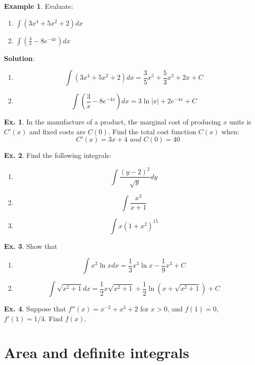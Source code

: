 \documentclass[10pt,a4paper]{book}
\theoremstyle{definition}\newtheorem{definition}{Definition}
\theoremstyle{definition}\newtheorem{fact}{Fact}
\theoremstyle{definition}\newtheorem{ex}{Ex.}
\theoremstyle{definition}\newtheorem{project}{Project}
\theoremstyle{definition}\newtheorem{problem}{Problem}
\theoremstyle{definition}\newtheorem{example}{Example}
\numberwithin{theorem}{chapter}
\numberwithin{corollary}{chapter}
\numberwithin{assumption}{chapter}
\numberwithin{definition}{chapter}
\numberwithin{prop}{chapter}
\numberwithin{notation}{chapter}
\numberwithin{problem}{chapter}
\numberwithin{example}{chapter}
\numberwithin{fact}{chapter}
\numberwithin{ex}{chapter}
\begin{document}
	\begin{example}
		Evaluate:
		\begin{enumerate}[label=(\alph*)]
			\item $\int (3x^4+5x^2+2)dx$
			\item $\int (\frac{3}{x}-8e^{-4x}) dx$
		\end{enumerate}
		
		\textbf{Solution}:
		\begin{enumerate}[label=(\alph*)]
			\item $$\int (3x^4+5x^2+2)dx = \frac{3}{5}x^5+\frac{5}{3}x^3+2x+C$$
			\item $$\int \left(\frac{3}{x}-8e^{-4x}\right) dx = 3\ln |x|+2e^{-4x}+C$$
		\end{enumerate}
	\end{example}
	
	\begin{ex}
		In the manufacture of a product, the marginal cost of producing $x$ units is $C'(x)$ and fixed costs are $C(0)$. Find the total cost function $C(x)$ when:
		$$C'(x) = 3x+4 \,\,and\,\, C(0)=40$$
	\end{ex}
	
	\begin{ex}
		Find the following integrals:
		\begin{enumerate}[label=(\alph*)]
			\item $$\int \frac{(y-2)^2}{\sqrt{y}}dy$$
			\item $$\int \frac{x^3}{x+1}$$
			\item $$\int x(1+x^2)^{15}$$
		\end{enumerate}
	\end{ex}
	
	\begin{ex}
		Show that
		\begin{enumerate}[label=(\alph*)]
			\item $$\int x^2\ln x dx = \frac{1}{3}x^3\ln x - \frac{1}{9}x^3 + C$$
			\item $$\int \sqrt{x^2 +1}dx = \frac{1}{2}x \sqrt{x^2+1}+\frac{1}{2}\ln \left( x+ \sqrt{x^2+1} \right) + C$$
		\end{enumerate}
	\end{ex}
	
	\begin{ex}
		Suppose that $f''(x) = x^{-2}+x^3+2$ for $x>0$, and $f(1)=0$, $f'(1)=1/4$. Find $f(x)$.
	\end{ex}
	
	\section{Area and definite integrals}
	
\end{document}

